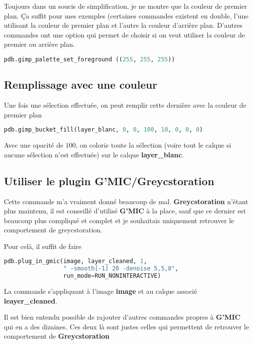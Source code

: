 \documentclass[a4paper,twoside]{article}
\begin{document}
Toujours dans un soucis de simplification, je ne montre que la couleur de premier plan. Ça suffit pour mes exemples (certaines commandes existent en double, l'une utilisant la couleur de premier plan et l'autre la couleur d'arrière plan. D'autres commandes ont une option qui permet de choisir si on veut utiliser la couleur de premier ou arrière plan. 

\begin{lstlisting}[language=Python]
pdb.gimp_palette_set_foreground ((255, 255, 255))
\end{lstlisting}

\subsection{Remplissage avec une couleur}
Une fois une sélection effectuée, on peut remplir cette dernière avec la couleur de premier plan

\begin{lstlisting}[language=Python]
pdb.gimp_bucket_fill(layer_blanc, 0, 0, 100, 10, 0, 0, 0)
\end{lstlisting}
Avec une opacité de $100$, on colorie toute la sélection (voire tout le calque si aucune sélection n'est effectuée) sur le calque \textbf{layer\_blanc}.

\subsection{Utiliser le plugin G'MIC/Greycstoration}
Cette commande m'a vraiment donné beaucoup de mal. \textbf{Greycstoration} n'étant plus maintenu, il est conseillé d'utilisé \textbf{G'MIC} à la place, sauf que ce dernier est beaucoup plus compliqué et complet et je souhaitais uniquement retrouver le comportement de greycstoration. 

Pour celà, il suffit de faire 
\begin{lstlisting}[language=Python]
pdb.plug_in_gmic(image, layer_cleaned, 1, 
                 " -smooth[-1] 20 -denoise 5,5,8", 
                 run_mode=RUN_NONINTERACTIVE)
\end{lstlisting}
La commande s'appliquant à l'image \textbf{image} et au calque associé \textbf{leayer\_cleaned}. 

\begin{remarque}
Il est bien entendu possible de rajouter d'autres commandes propres à \textbf{G'MIC} qui en a des dizaines. Ces deux là sont justes celles qui permettent de retrouver le comportement de \textbf{Greycstoration}
\end{remarque}
\end{document}
